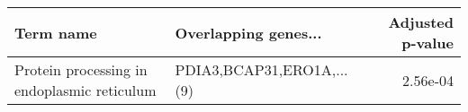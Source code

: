 \begin{tabular}{llr}
\toprule
                                  Term name &      Overlapping genes... &  Adjusted p-value \\
\midrule
Protein processing in endoplasmic reticulum & PDIA3,BCAP31,ERO1A,...(9) &          2.56e-04 \\
\bottomrule
\end{tabular}
